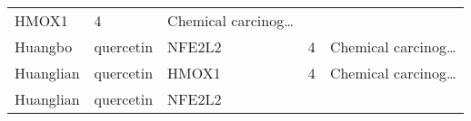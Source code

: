 \documentclass[
]{article}
\begin{document}
\begin{longtable}[]{@{}lllll@{}}
\begin{minipage}[t]{0.12\columnwidth}
HMOX1\strut
\end{minipage} & \begin{minipage}[t]{0.19\columnwidth}\raggedright
4\strut
\end{minipage} & \begin{minipage}[t]{0.21\columnwidth}\raggedright
Chemical carcinog\ldots{}\strut
\end{minipage}\tabularnewline
\begin{minipage}[t]{0.17\columnwidth}\raggedright
Huangbo\strut
\end{minipage} & \begin{minipage}[t]{0.16\columnwidth}\raggedright
quercetin\strut
\end{minipage} & \begin{minipage}[t]{0.12\columnwidth}\raggedright
NFE2L2\strut
\end{minipage} & \begin{minipage}[t]{0.19\columnwidth}\raggedright
4\strut
\end{minipage} & \begin{minipage}[t]{0.21\columnwidth}\raggedright
Chemical carcinog\ldots{}\strut
\end{minipage}\tabularnewline
\begin{minipage}[t]{0.17\columnwidth}\raggedright
Huanglian\strut
\end{minipage} & \begin{minipage}[t]{0.16\columnwidth}\raggedright
quercetin\strut
\end{minipage} & \begin{minipage}[t]{0.12\columnwidth}\raggedright
HMOX1\strut
\end{minipage} & \begin{minipage}[t]{0.19\columnwidth}\raggedright
4\strut
\end{minipage} & \begin{minipage}[t]{0.21\columnwidth}\raggedright
Chemical carcinog\ldots{}\strut
\end{minipage}\tabularnewline
\begin{minipage}[t]{0.17\columnwidth}\raggedright
Huanglian\strut
\end{minipage} & \begin{minipage}[t]{0.16\columnwidth}\raggedright
quercetin\strut
\end{minipage} & \begin{minipage}[t]{0.12\columnwidth}\raggedright
NFE2L2\strut
\end{minipage} & \begin{minipage}[t]{0.19\columnwidth}\raggedright

\end{minipage}
\end{longtable}
\end{document}
